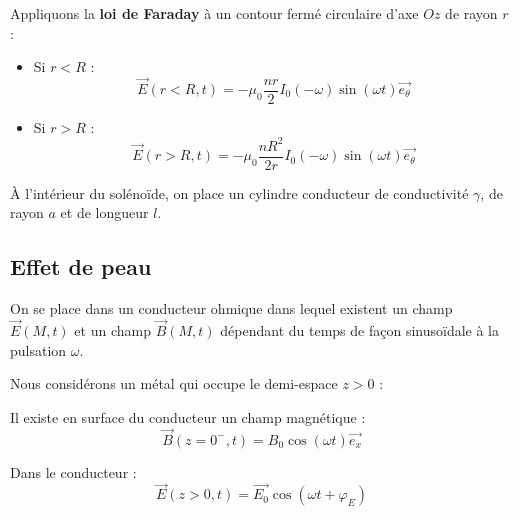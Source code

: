 Appliquons la \textbf{loi de Faraday} à un contour fermé circulaire d'axe $Oz$ de rayon $r$ :
\begin{itemize}

    \item Si $r < R$ : 
      \begin{equation}
        \overrightarrow{E}(r < R, t)= - \mu_0 \frac{nr}{2}  I_0 (- \omega) \sin (\omega t) \overrightarrow{e _ \theta}
      \end{equation}

    \item Si $r > R$ : 
      \begin{equation}
        \overrightarrow{E}(r > R, t)= - \mu_0 \frac{nR ^{2}}{2r}  I_0 (- \omega) \sin (\omega t) \overrightarrow{e _ \theta}
      \end{equation}

\end{itemize}

À l'intérieur du solénoïde, on place un cylindre conducteur de conductivité $\gamma$, de rayon $a$ et de longueur $l$.



\subsection{Effet de peau} %
\label{sub:Effet de peau}


On se place dans un conducteur ohmique dans lequel existent un champ $\overrightarrow{E}(M,t)$ et un champ $\overrightarrow{B}(M,t)$ dépendant du temps de façon sinusoïdale à la pulsation $\omega$. 

Nous considérons un métal qui occupe le demi-espace $z>0$ : 

Il existe en surface du conducteur un champ magnétique : 
\begin{equation}
  \overrightarrow{B}(z = 0 ^{-}, t) = B_0 \cos (\omega t) \overrightarrow{e_x}
\end{equation}

Dans le conducteur : 
\begin{equation}
  \overrightarrow{E}(z>0, t) = \overrightarrow{E_0} \cos ( \omega t + \varphi_E)
\end{equation}

